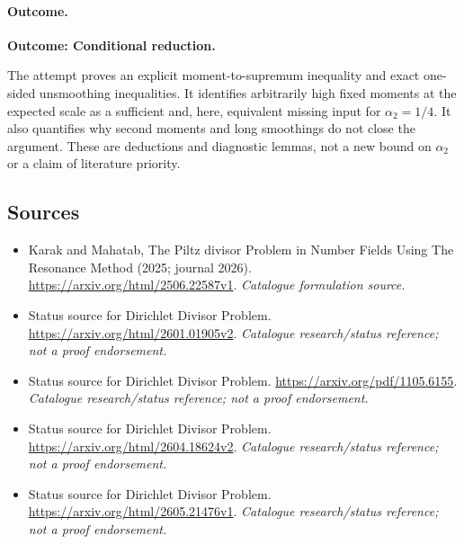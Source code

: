 \documentclass[11pt,a4paper]{article}
\numberwithin{equation}{section}
\begin{document}
\paragraph{Outcome.}
\textbf{Outcome: Conditional reduction.}

The attempt proves an explicit moment-to-supremum inequality and exact
one-sided unsmoothing inequalities. It identifies arbitrarily high fixed
moments at the expected scale as a sufficient and, here, equivalent missing
input for $\alpha_2=1/4$. It also quantifies why second moments and long
smoothings do not close the argument. These are deductions and diagnostic
lemmas, not a new bound on $\alpha_2$ or a claim of literature priority.
\subsection{Sources}
\begin{itemize}\raggedright
\item[\textnormal{[S1]}]\hypertarget{source:statement:1}{} Karak and Mahatab, The Piltz divisor Problem in Number Fields Using The Resonance Method (2025; journal 2026).
\url{https://arxiv.org/html/2506.22587v1}.
{\small\textit{Catalogue formulation source.}}
\item[\textnormal{[S2]}]\hypertarget{source:statement:2}{} Status source for Dirichlet Divisor Problem.
\url{https://arxiv.org/html/2601.01905v2}.
{\small\textit{Catalogue research/status reference; not a proof endorsement.}}
\item[\textnormal{[S3]}]\hypertarget{source:statement:3}{} Status source for Dirichlet Divisor Problem.
\url{https://arxiv.org/pdf/1105.6155}.
{\small\textit{Catalogue research/status reference; not a proof endorsement.}}
\item[\textnormal{[S4]}]\hypertarget{source:statement:4}{} Status source for Dirichlet Divisor Problem.
\url{https://arxiv.org/html/2604.18624v2}.
{\small\textit{Catalogue research/status reference; not a proof endorsement.}}
\item[\textnormal{[S5]}]\hypertarget{source:statement:5}{} Status source for Dirichlet Divisor Problem.
\url{https://arxiv.org/html/2605.21476v1}.
{\small\textit{Catalogue research/status reference; not a proof endorsement.}}
\end{itemize}
\end{document}

